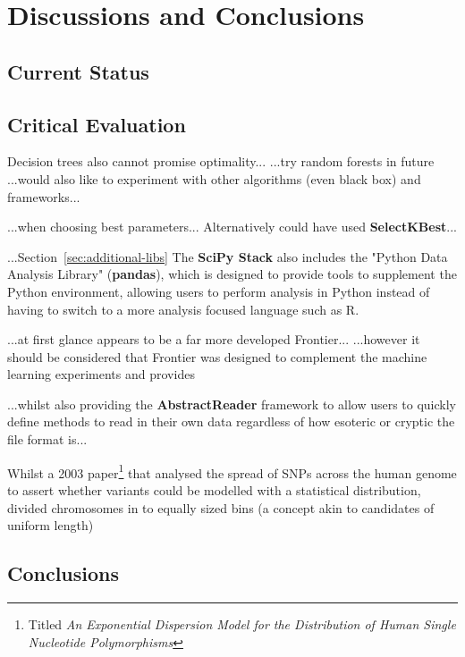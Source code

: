 \part{Discussions and Conclusions}
\chapter{Current Status}

\chapter{Critical Evaluation}
Decision trees also cannot promise optimality...
...try random forests in future
...would also like to experiment with other algorithms (even black box) and frameworks...

...when choosing best parameters...
Alternatively could have used \textbf{SelectKBest}...

...Section~\ref{sec:additional-libs}
The \textbf{SciPy Stack} also includes the "Python Data Analysis Library"
(\textbf{pandas}), which is designed to provide tools to supplement the Python
environment, allowing users to perform analysis in Python instead of having to
switch to a more analysis focused language such as R.

...at first glance appears to be a far more developed Frontier...
...however it should be considered that Frontier was designed to complement the
machine learning experiments and provides 

...whilst also providing the \textbf{AbstractReader} framework to allow users to
quickly define methods to read in their own data regardless of how esoteric or
cryptic the file format is...


Whilst a 2003 paper\citep{kendal2003exponential}\footnote{Titled \textit{An Exponential
Dispersion Model for the Distribution of Human Single Nucleotide
Polymorphisms}\citep{kendal2003exponential}} that analysed the spread of SNPs
across the human genome to assert whether variants could be modelled with a
statistical distribution, divided chromosomes in to equally sized bins (a
concept akin to candidates of uniform length)

\chapter{Conclusions}


